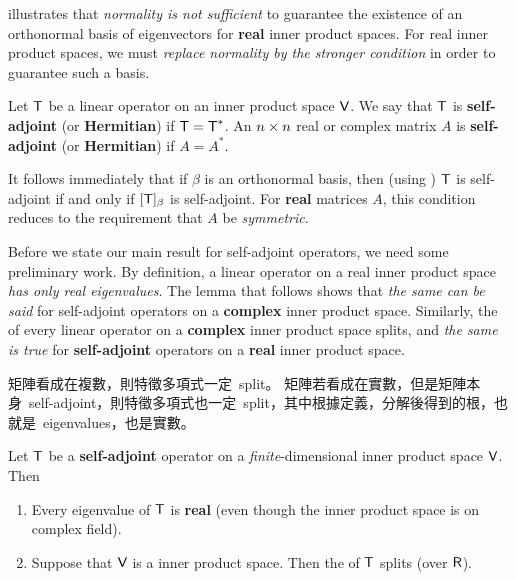 \begin{remark} \label{remark 6.4.5}
 illustrates that \emph{normality is not sufficient} to guarantee the existence of an orthonormal basis of eigenvectors for \textbf{real} inner product spaces.
For real inner product spaces, we must \emph{replace normality by the stronger condition}  in order to guarantee such a basis.
\end{remark}

\begin{definition} \label{def 6.9}
Let \(\textsf{T}\) be a linear operator on an inner product space \(\textsf{V}\).
We say that \(\textsf{T}\) is \textbf{self-adjoint} (or \textbf{Hermitian}) if \(\textsf{T} = \textsf{T}^*\).
An \(n \times n\) real or complex matrix \(A\) is \textbf{self-adjoint} (or \textbf{Hermitian}) if \(A = A^*\).
\end{definition}

\begin{remark} \label{remark 6.4.6}
It follows immediately that if \(\beta\) is an orthonormal basis, then (using ) \(\textsf{T}\) is self-adjoint if and only if \([\textsf{T}]_{\beta}\) is self-adjoint.
For \textbf{real} matrices \(A\), this condition reduces to the requirement that \(A\) be \emph{symmetric}.
\end{remark}

\begin{remark} \label{remark 6.4.7}
Before we state our main result for self-adjoint operators, we need some preliminary work.
By definition, a linear operator on a real inner product space \emph{has only real eigenvalues}.
The lemma that follows shows that \emph{the same can be said} for self-adjoint operators on a \textbf{complex} inner product space.
Similarly, the \CPOLY{} of every linear operator on a \textbf{complex} inner product space splits, and \emph{the same is true} for \textbf{self-adjoint} operators on a \textbf{real} inner product space.
\end{remark}

\begin{note}
矩陣看成在複數，則特徵多項式一定\ split。
矩陣若看成在實數，但是矩陣本身\ self-adjoint，則特徵多項式也一定\ split，其中根據定義，分解後得到的根，也就是\ eigenvalues，也是實數。
\end{note}

\begin{lemma} \label{lem 6.5}
Let \(\textsf{T}\) be a \textbf{self-adjoint} operator on a \emph{finite}-dimensional inner product space \(\textsf{V}\).
Then
\begin{enumerate}
\item Every eigenvalue of \(\textsf{T}\) is \textbf{real} (even though the inner product space is on complex field).
\item Suppose that \(\textsf{V}\) is a \textbf{} inner product space.
Then the \CPOLY{} of \(\textsf{T}\) splits (over \(\textsf{R}\)).
\end{enumerate}
\end{lemma}

